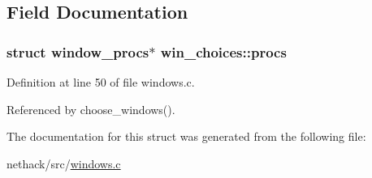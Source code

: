 \subsection{Field Documentation}
\hypertarget{structwin__choices_a44a0c837c11d0ec0713e864d1a4169bb}{
\subsubsection[{procs}]{\setlength{\rightskip}{0pt plus 5cm}struct {\bf window\+\_\+procs}$\ast$ win\+\_\+choices\+::procs}}\label{structwin__choices_a44a0c837c11d0ec0713e864d1a4169bb}


Definition at line 50 of file windows.\+c.



Referenced by choose\+\_\+windows().



The documentation for this struct was generated from the following file\+:\begin{DoxyCompactItemize}
\item 
nethack/src/\hyperlink{windows_8c}{windows.\+c}\end{DoxyCompactItemize}
